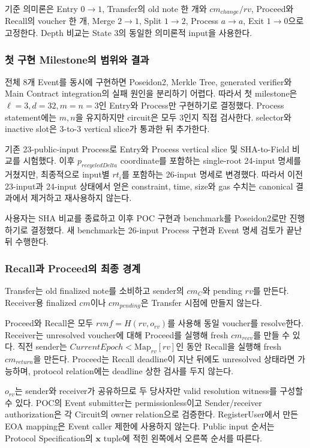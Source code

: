 \documentclass[11pt]{extarticle}
\newcommand{\Map}[1]{\mathrm{Map}_{#1}}
\begin{document}
기준 의미론은 Entry $0\to1$, Transfer의 old note 한 개와 $cm_{change}/rv$, Proceed와
Recall의 voucher 한 개, Merge $2\to1$, Split $1\to2$, Process $a\to a$, Exit
$1\to0$으로 고정한다. Depth 비교는 State 3의 동일한 의미론적 input을 사용한다.

\subsubsection{첫 구현 Milestone의 범위와 결과}

전체 8개 Event를 동시에 구현하면 Poseidon2, Merkle Tree, generated verifier와 Main
Contract integration의 실패 원인을 분리하기 어렵다. 따라서 첫 milestone은
$\ell=3,d=32,m=n=3$인 Entry와 Process만 구현하기로 결정했다. Process statement에는
$m,n$을 유지하지만 circuit은 모두 3인지 직접 검사한다. selector와 inactive slot은
3-to-3 vertical slice가 통과한 뒤 추가한다.

기존 23-public-input Process로 Entry와 Process vertical slice 및 SHA-to-Field 비교를
시험했다. 이후 $p_{recycledDelta}$ coordinate를 포함하는 single-root 24-input 명세를
거쳤지만, 최종적으로 input별 $rt_i$를 포함하는 26-input 명세로 변경했다. 따라서 이전
23-input과 24-input 상태에서 얻은 constraint, time, size와 gas 수치는 canonical 결과에서
제거하고 재사용하지 않는다.

사용자는 SHA 비교를 종료하고 이후 POC 구현과 benchmark를 Poseidon2로만 진행하기로
결정했다. 새 benchmark는 26-input Process 구현과 Event 명세 검토가 끝난 뒤 수행한다.

\subsubsection{Recall과 Proceed의 최종 경계}

Transfer는 old finalized note를 소비하고 sender의 $cm_C$와 pending $rv$를 만든다.
Receiver용 finalized $cm$이나 $cm_{pending}$은 Transfer 시점에 만들지 않는다.

Proceed와 Recall은 모두 $rvnf=H(rv,o_{rv})$를 사용해 동일 voucher를 resolve한다.
Receiver는 unresolved voucher에 대해 Proceed를 실행해 fresh $cm_{recv}$를 만들 수 있다.
직전 sender는 $CurrentEpoch<\Map{rv}[rv]$인 동안 Recall을 실행해 fresh
$cm_{return}$을 만든다. Proceed는 Recall deadline이 지난 뒤에도 unresolved 상태라면
가능하며, protocol relation에는 deadline 상한 검사를 두지 않는다.

$o_{rv}$는 sender와 receiver가 공유하므로 두 당사자만 valid resolution witness를
구성할 수 있다. POC의 Event submitter는 permissionless이고 Sender/receiver
authorization은 각 Circuit의 owner relation으로 검증한다. RegisterUser에서 만든 EOA
mapping은 Event caller 제한에 사용하지 않는다. Public input 순서는 Protocol Specification의
$\mathbf{x}$ tuple에 적힌 왼쪽에서 오른쪽 순서를 따른다.
\end{document}
